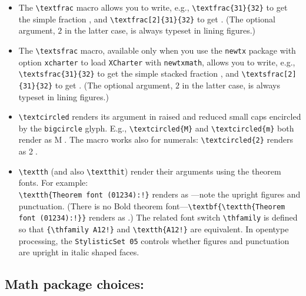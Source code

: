 \documentclass[11pt]{article}
\begin{document}
\begin{itemize}
\item The \verb|\textfrac| macro allows you to write, e.g.,  \verb|\textfrac{31}{32}| to get the simple fraction , and \verb|\textfrac[2]{31}{32}| to get . (The optional argument, $2$ in the latter case, is always typeset in lining figures.)
\item The \verb|\textsfrac| macro, available only when you use the {\tt newtx} package with option {\tt xcharter} to load {\tt XCharter} with {\tt newtxmath}, allows you to write, e.g.,  \verb|\textsfrac{31}{32}| to get the simple stacked fraction 
\iftutex
{},\fi
 and \verb|\textsfrac[2]{31}{32}| 
 \iftutex
 to get \fi%
 . (The optional argument, $2$ in the latter case, is always typeset in lining figures.)

\item \verb|\textcircled| renders its argument in raised and reduced small caps encircled by the {\tt bigcircle} glyph. E.g., \verb|\textcircled{M}| and \verb|\textcircled{m}| both render as \textcircled{M}. The macro works also for numerals: \verb|\textcircled{2}| renders as \textcircled{2}.
\item \verb|\textth| (and also \verb|\textthit|) render their arguments using the theorem fonts. For example:\\ 
\verb|\textth{Theorem font (01234):!}| renders as ---note the upright figures and punctuation. (There is no Bold theorem font---\verb|\textbf{\textth{Theorem font (01234):!}}| renders as \textbf{}.) The related font switch \verb|\thfamily| is defined so that \verb|{\thfamily A12!}| and \verb|\textth{A12!}| are equivalent.  In opentype processing, the {\tt StylisticSet 05} controls whether  figures and punctuation are upright in italic shaped faces.

\end{itemize}
\subsection*{Math package choices:}
\end{document}
